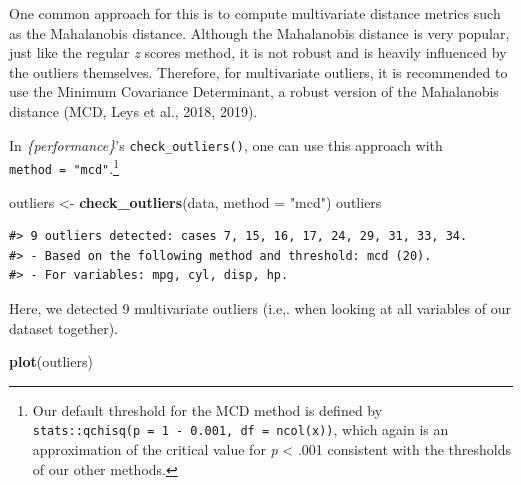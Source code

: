 \documentclass{article}
\newenvironment{Shaded}{\begin{snugshade}}{\end{snugshade}}
\newcommand{\AttributeTok}[1]{\textcolor[rgb]{0.13,0.29,0.53}{#1}}
\newcommand{\FunctionTok}[1]{\textcolor[rgb]{0.13,0.29,0.53}{\textbf{#1}}}
\newcommand{\NormalTok}[1]{#1}
\newcommand{\OtherTok}[1]{\textcolor[rgb]{0.56,0.35,0.01}{#1}}
\newcommand{\StringTok}[1]{\textcolor[rgb]{0.31,0.60,0.02}{#1}}
\begin{document}
One common approach for this is to compute multivariate distance metrics
such as the Mahalanobis distance. Although the Mahalanobis distance is
very popular, just like the regular \emph{z} scores method, it is not
robust and is heavily influenced by the outliers themselves. Therefore,
for multivariate outliers, it is recommended to use the Minimum
Covariance Determinant, a robust version of the Mahalanobis distance
(MCD, Leys et al., 2018, 2019).

In \emph{\{performance\}}'s \texttt{check\_outliers()}, one can use this
approach with \texttt{method\ =\ "mcd"}.\footnote{Our default threshold
  for the MCD method is defined by
  \texttt{stats::qchisq(p\ =\ 1\ -\ 0.001,\ df\ =\ ncol(x))}, which
  again is an approximation of the critical value for \emph{p}
  \textless{} .001 consistent with the thresholds of our other methods.}

\begin{Shaded}
\begin{Highlighting}[]
\NormalTok{outliers }\OtherTok{\textless{}{-}} \FunctionTok{check\_outliers}\NormalTok{(data, }\AttributeTok{method =} \StringTok{"mcd"}\NormalTok{)}
\NormalTok{outliers}
\end{Highlighting}
\end{Shaded}

\begin{verbatim}
#> 9 outliers detected: cases 7, 15, 16, 17, 24, 29, 31, 33, 34.
#> - Based on the following method and threshold: mcd (20).
#> - For variables: mpg, cyl, disp, hp.
\end{verbatim}

Here, we detected 9 multivariate outliers (i.e,. when looking at all
variables of our dataset together).

\begin{Shaded}
\begin{Highlighting}[]
\FunctionTok{plot}\NormalTok{(outliers)}
\end{Highlighting}
\end{Shaded}
\end{document}
